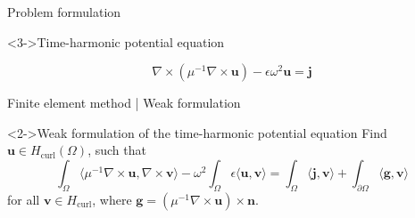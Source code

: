 \documentclass{beamer}
\begin{document}
\begin{frame}{Problem formulation}

    \begin{block}<3->{Time-harmonic potential equation}

        \begin{equation}
            \nabla \times (\mu^{-1} \nabla \times \mathbf{u}) - \epsilon \omega^2 \mathbf{u} = \mathbf{j}
            \label{equ:maxwell-potential}
        \end{equation}

    \end{block}

\end{frame}

\begin{frame}{Finite element method | Weak formulation}


    \begin{block}<2->{Weak formulation of the time-harmonic potential equation}
        Find $\mathbf{u} \in H_{\text{curl}}(\Omega)$, such that
        \begin{equation}
        \int_{\Omega} \langle {\mu^{-1} \nabla \times \mathbf{u}}, \nabla \times \mathbf{v} \rangle
        - \omega^2 \int_{\Omega} \epsilon \langle \mathbf{u}, \mathbf{v} \rangle
        = \int_{\Omega} \langle \mathbf{j}, \mathbf{v} \rangle
        + \int_{\partial \Omega} \langle \mathbf{g}, \mathbf{v} \rangle
        \label{equ:maxwell-weak}
        \end{equation}
        for all $\mathbf{v} \in H_{\text{curl}}$, where $\mathbf{g} = ({\mu^{-1} \nabla \times \mathbf{u}}) \times \mathbf{n}$.
    \end{block}

\end{frame}
\end{document}
